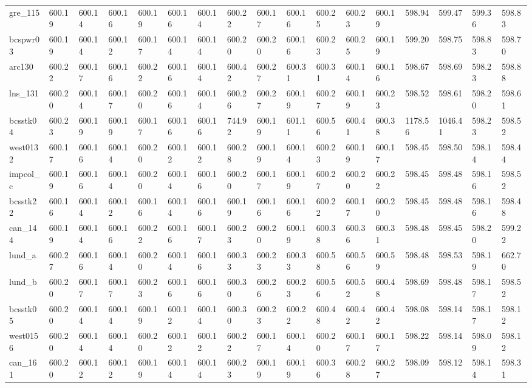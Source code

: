 \begin{tabular}{lllllllllllllllll}
gre\_115 & 600.19 & 600.14 & 600.16 & 600.19 & 600.16 & 600.14 & 600.22 & 600.17 & 600.16 & 600.25 & 600.23 & 600.19 & 598.94 & 599.47 & 599.36 & 598.83 \\
bcspwr03 & 600.19 & 600.14 & 600.12 & 600.17 & 600.14 & 600.14 & 600.20 & 600.20 & 600.16 & 600.23 & 600.25 & 600.19 & 599.20 & 598.75 & 598.83 & 598.70 \\
arc130 & 600.22 & 600.17 & 600.16 & 600.22 & 600.16 & 600.14 & 600.42 & 600.27 & 600.31 & 600.31 & 600.14 & 600.16 & 598.67 & 598.69 & 598.23 & 598.88 \\
lns\_131 & 600.20 & 600.14 & 600.17 & 600.20 & 600.16 & 600.14 & 600.26 & 600.27 & 600.19 & 600.27 & 600.19 & 600.23 & 598.52 & 598.61 & 598.20 & 598.61 \\
bcsstk04 & 600.23 & 600.19 & 600.19 & 600.17 & 600.16 & 600.16 & 744.92 & 600.19 & 601.11 & 600.56 & 600.41 & 600.38 & 1178.56 & 1046.41 & 598.23 & 598.52 \\
west0132 & 600.17 & 600.16 & 600.14 & 600.20 & 600.12 & 600.12 & 600.28 & 600.19 & 600.14 & 600.23 & 600.19 & 600.17 & 598.45 & 598.50 & 598.14 & 598.44 \\
impcol\_c & 600.19 & 600.16 & 600.14 & 600.20 & 600.14 & 600.16 & 600.20 & 600.17 & 600.19 & 600.27 & 600.20 & 600.22 & 598.45 & 598.48 & 598.16 & 598.52 \\
bcsstk22 & 600.16 & 600.14 & 600.12 & 600.16 & 600.14 & 600.16 & 600.19 & 600.16 & 600.16 & 600.22 & 600.17 & 600.20 & 598.45 & 598.48 & 598.16 & 598.48 \\
can\_144 & 600.19 & 600.14 & 600.16 & 600.22 & 600.16 & 600.17 & 600.23 & 600.20 & 600.19 & 600.38 & 600.36 & 600.31 & 598.48 & 598.45 & 598.20 & 599.22 \\
lund\_a & 600.27 & 600.16 & 600.14 & 600.20 & 600.14 & 600.16 & 600.33 & 600.23 & 600.33 & 600.58 & 600.56 & 600.59 & 598.48 & 598.53 & 598.19 & 662.70 \\
lund\_b & 600.20 & 600.17 & 600.17 & 600.23 & 600.16 & 600.16 & 600.30 & 600.26 & 600.23 & 600.56 & 600.52 & 600.48 & 598.69 & 598.48 & 598.17 & 598.52 \\
bcsstk05 & 600.20 & 600.14 & 600.14 & 600.19 & 600.12 & 600.14 & 600.30 & 600.23 & 600.22 & 600.48 & 600.42 & 600.42 & 598.08 & 598.14 & 598.17 & 598.12 \\
west0156 & 600.20 & 600.14 & 600.14 & 600.20 & 600.12 & 600.12 & 600.22 & 600.17 & 600.14 & 600.20 & 600.17 & 600.17 & 598.22 & 598.14 & 598.09 & 598.12 \\
can\_161 & 600.20 & 600.12 & 600.12 & 600.19 & 600.14 & 600.14 & 600.23 & 600.19 & 600.19 & 600.36 & 600.28 & 600.27 & 598.09 & 598.12 & 598.14 & 598.31 \\

\end{tabular}
